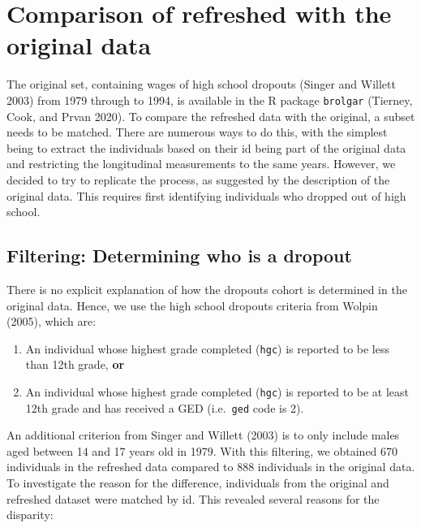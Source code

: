 \documentclass[12pt]{article}
\providecommand{\tightlist}{%
  \setlength{\itemsep}{0pt}\setlength{\parskip}{0pt}}
\begin{document}
\hypertarget{compare}{%
\section{Comparison of refreshed with the original data}\label{compare}}

The original set, containing wages of high school dropouts (Singer and Willett 2003) from 1979 through to 1994, is available in the R package \texttt{brolgar} (Tierney, Cook, and Prvan 2020). To compare the refreshed data with the original, a subset needs to be matched. There are numerous ways to do this, with the simplest being to extract the individuals based on their id being part of the original data and restricting the longitudinal measurements to the same years. However, we decided to try to replicate the process, as suggested by the description of the original data. This requires first identifying individuals who dropped out of high school.

\hypertarget{filtering-determining-who-is-a-dropout}{%
\subsection{Filtering: Determining who is a dropout}\label{filtering-determining-who-is-a-dropout}}

There is no explicit explanation of how the dropouts cohort is determined in the original data. Hence, we use the high school dropouts criteria from Wolpin (2005), which are:

\begin{enumerate}
\def\labelenumi{\arabic{enumi}.}
\tightlist
\item
  An individual whose highest grade completed (\texttt{hgc}) is reported to be less than 12th grade, \textbf{or}
\item
  An individual whose highest grade completed (\texttt{hgc}) is reported to be at least 12th grade and has received a GED (i.e.~\texttt{ged} code is 2).
\end{enumerate}

An additional criterion from Singer and Willett (2003) is to only include males aged between 14 and 17 years old in 1979. With this filtering, we obtained 670 individuals in the refreshed data compared to 888 individuals in the original data. To investigate the reason for the difference, individuals from the original and refreshed dataset were matched by id. This revealed several reasons for the disparity:
\end{document}
